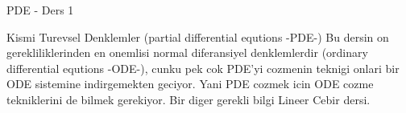 \documentclass[12pt,fleqn]{article}
\begin{document}
PDE - Ders 1

Kismi Turevsel Denklemler (partial differential equtions -PDE-) Bu dersin
on gerekliliklerinden en onemlisi normal diferansiyel denklemlerdir (ordinary
differential equtions -ODE-), cunku pek cok PDE'yi cozmenin teknigi onlari
bir ODE sistemine indirgemekten geciyor. Yani PDE cozmek icin ODE cozme
tekniklerini de bilmek gerekiyor. Bir diger gerekli bilgi Lineer Cebir
dersi. 
\end{document}
